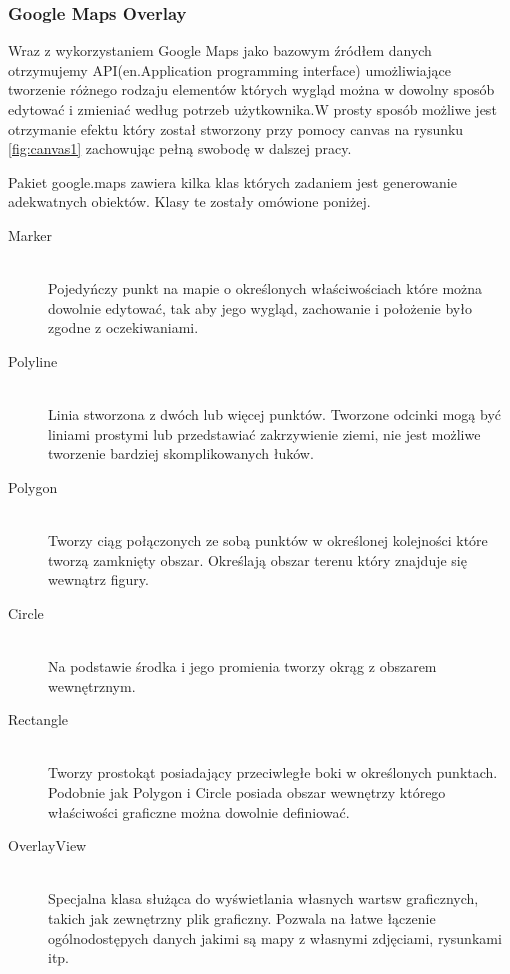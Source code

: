 \subsubsection{Google Maps Overlay}
\label{subsubsec:overlays}

Wraz z wykorzystaniem Google Maps jako bazowym źródłem danych otrzymujemy API(en.Application programming interface) umożliwiające tworzenie różnego rodzaju elementów których wygląd można w dowolny sposób edytować i zmieniać według potrzeb użytkownika.W prosty sposób możliwe jest otrzymanie efektu który został stworzony przy pomocy canvas na rysunku \ref{fig:canvas1} zachowując pełną swobodę w dalszej pracy.

Pakiet google.maps zawiera kilka klas których zadaniem jest generowanie adekwatnych obiektów. Klasy te zostały omówione poniżej.

\begin{description}
\item[Marker] \hfill \\
    Pojedyńczy punkt na mapie o określonych właściwościach które można dowolnie edytować, tak aby jego wygląd, zachowanie i położenie było zgodne z oczekiwaniami.

\item[Polyline] \hfill \\
  Linia stworzona z dwóch lub więcej punktów. Tworzone odcinki mogą być liniami prostymi lub przedstawiać zakrzywienie ziemi, nie jest możliwe tworzenie bardziej skomplikowanych łuków.

\item[Polygon] \hfill \\
  Tworzy ciąg połączonych ze sobą punktów w określonej kolejności które tworzą zamknięty obszar. Określają obszar terenu który znajduje się wewnątrz figury.

\item[Circle] \hfill \\
  Na podstawie środka i jego promienia tworzy okrąg z obszarem wewnętrznym.

\item[Rectangle] \hfill \\
  Tworzy prostokąt posiadający przeciwległe boki w określonych punktach. Podobnie jak Polygon i Circle posiada obszar wewnętrzy którego właściwości graficzne można dowolnie definiować.

\item[OverlayView] \hfill \\
  Specjalna klasa służąca do wyświetlania własnych wartsw graficznych, takich jak zewnętrzny plik graficzny. Pozwala na łatwe łączenie ogólnodostępych danych jakimi są mapy z własnymi zdjęciami, rysunkami itp.

\end{description}

